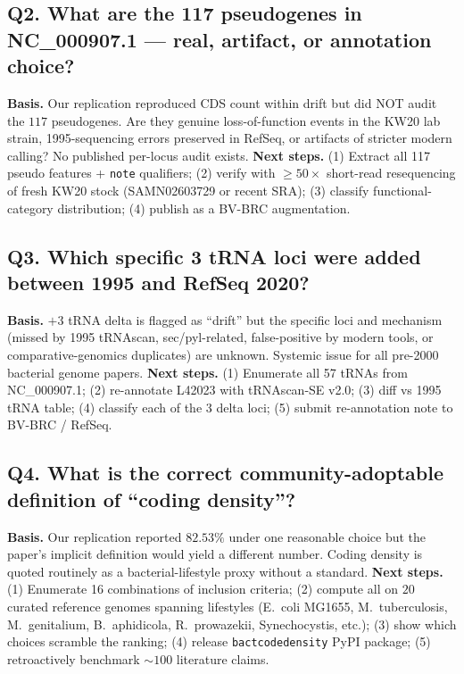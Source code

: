 \documentclass[10pt]{article}
\begin{document}
\subsection*{Q2. What are the 117 pseudogenes in NC\_000907.1 --- real, artifact, or annotation choice?}
\textbf{Basis.} Our replication reproduced CDS count within drift but did NOT audit the
$117$ pseudogenes. Are they genuine loss-of-function events in the KW20 lab strain,
1995-sequencing errors preserved in RefSeq, or artifacts of stricter modern calling? No
published per-locus audit exists.
\textbf{Next steps.} (1) Extract all 117 pseudo features + \texttt{note} qualifiers;
(2) verify with $\geq 50\times$ short-read resequencing of fresh KW20 stock (SAMN02603729 or
recent SRA); (3) classify functional-category distribution; (4) publish as a BV-BRC
augmentation.

\subsection*{Q3. Which specific 3 tRNA loci were added between 1995 and RefSeq 2020?}
\textbf{Basis.} $+3$ tRNA delta is flagged as ``drift'' but the specific loci and mechanism
(missed by 1995 tRNAscan, sec/pyl-related, false-positive by modern tools, or comparative-genomics
duplicates) are unknown. Systemic issue for all pre-2000 bacterial genome papers.
\textbf{Next steps.} (1) Enumerate all 57 tRNAs from NC\_000907.1; (2) re-annotate L42023
with tRNAscan-SE v2.0; (3) diff vs 1995 tRNA table; (4) classify each of the 3 delta loci;
(5) submit re-annotation note to BV-BRC / RefSeq.

\subsection*{Q4. What is the correct community-adoptable definition of ``coding density''?}
\textbf{Basis.} Our replication reported $82.53\%$ under one reasonable choice but the
paper's implicit definition would yield a different number. Coding density is quoted
routinely as a bacterial-lifestyle proxy without a standard.
\textbf{Next steps.} (1) Enumerate 16 combinations of inclusion criteria; (2) compute all on
$20$ curated reference genomes spanning lifestyles (E.\ coli MG1655, M.\ tuberculosis,
M.\ genitalium, B.\ aphidicola, R.\ prowazekii, Synechocystis, etc.); (3) show which choices
scramble the ranking; (4) release \texttt{bactcodedensity} PyPI package; (5) retroactively
benchmark $\sim 100$ literature claims.
\end{document}
